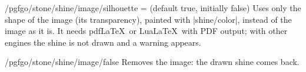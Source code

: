 \begin{key}{/pgfgo/stone/shine/image/silhouette =  (default true, initially false)}
	Uses only the shape of the image (its transparency), painted with |shine/color|, instead of the image as it is. It needs pdf\LaTeX\ or Lua\LaTeX\ with PDF output; with other engines the shine is not drawn and a warning appears.

	\begin{codeexample}[width=4cm]

		\begin{goban}
		\end{goban}
	\end{codeexample}
\end{key}

\begin{stylekey}{/pgfgo/stone/shine/image/false}
	Removes the image: the drawn shine comes back.
\end{stylekey}


